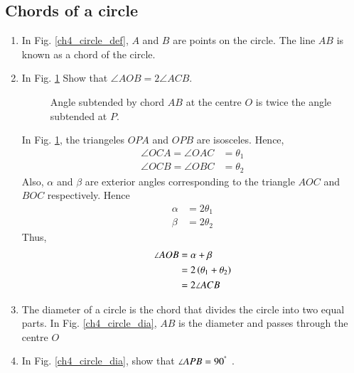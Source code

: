 \subsection{Chords of a circle}
%
\renewcommand{\theequation}{\theenumi}
\begin{enumerate}[label=\arabic*.,ref=\thesubsection.\theenumi]
%
\item
	In Fig. \ref{ch4_circle_def}, $A$ and $B$ are points on the circle.  The line $AB$ is known as a chord of the circle.

%
%
\item
	\label{ch4_prob_circle_subtend}
	In Fig. \ref{ch4_circle_subtend}  Show that $\angle AOB = 2\angle ACB $.

\begin{figure}[!ht]
	\begin{center}
		
		\resizebox{\columnwidth}{!}{}
	\end{center}
	\caption{Angle subtended by chord $AB$ at the centre $O$ is twice the angle subtended at $P$. }
	\label{ch4_circle_subtend}	
\end{figure}

\solution In Fig. \ref{ch4_circle_subtend}, the triangeles $OPA$ and $OPB$ are isosceles. Hence,
%
\begin{align}
\angle OCA = \angle OAC &= \theta_1 \\
\angle OCB = \angle OBC &= \theta_2
\end{align}
%
Also, $\alpha$ and $\beta$ are exterior angles corresponding to the triangle $AOC$ and $BOC$ respectively. Hence
%
\begin{align}
\alpha &= 2\theta_1 \\
\beta &= 2\theta_2
\end{align}
%
Thus,
%
\begin{align}
\angle AOB &= \alpha + \beta \\
&= 2\left(\theta_1 + \theta_2\right) \\
&= 2\angle ACB
\end{align}
%
\item
	The diameter of a circle is the chord that divides the circle into two equal parts. In Fig. \ref{ch4_circle_dia}, $AB$ is the diameter and passes through the centre $O$

%
\item
In Fig. \ref{ch4_circle_dia}, show that $\angle APB = 90^{\degree}$ .


\end{enumerate}
